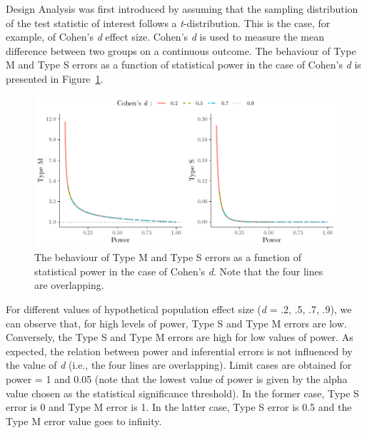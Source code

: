 \documentclass{article}\usepackage[]{graphicx}\usepackage[]{color}
\makeatletter
\def\maxwidth{ %
  \ifdim\Gin@nat@width>\linewidth
    \linewidth
  \else
    \Gin@nat@width
  \fi
}
\newenvironment{knitrout}{}{} %
\makeatother
\begin{document}
\begin{refsection}
Design Analysis was first introduced by \textcite{gelmanPowerCalculationsAssessing2014} assuming that the sampling distribution of the test statistic of interest follows a \emph{t}-distribution. This is the case, for example, of Cohen's \emph{d} effect size. Cohen's \emph{d} is used to measure the mean difference between two groups on a continuous outcome. The behaviour of Type M and Type S errors as a function of statistical power in the case of Cohen's \emph{d} is presented in Figure~\ref{fig:Plot_cohen}.



\begin{knitrout}
\color{fgcolor}\begin{figure}[!h]

{\centering \includegraphics[width=\maxwidth]{figure/Plot_cohen-1} 

}

\caption[The behaviour of Type M and Type S errors as a function of statistical power in the case of Cohen's \emph{d}]{The behaviour of Type M and Type S errors as a function of statistical power in the case of Cohen's \emph{d}. Note that the four lines are overlapping.}\label{fig:Plot_cohen}
\end{figure}


\end{knitrout}


For different values of hypothetical population effect size (\emph{d} = .2, .5, .7, .9), we can observe that, for high levels of power, Type S and Type M errors are low. Conversely, the Type S and Type M errors are high for low values of power. As expected, the relation between power and inferential errors is not influenced by the value of \emph{d} (i.e., the four lines are overlapping). Limit cases are obtained for power = 1 and 0.05 (note that the lowest value of power is given by the alpha value chosen as the statistical significance threshold). In the former case, Type S error is 0 and Type M error is 1. In the latter case, Type S error is 0.5 and the Type M error value goes to infinity.


\end{refsection}
\end{document}
